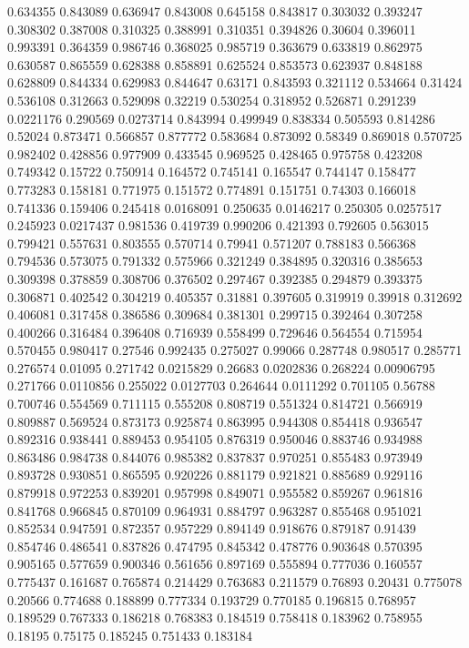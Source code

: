0.634355 0.843089
0.636947 0.843008
0.645158 0.843817
0.303032 0.393247
0.308302 0.387008
0.310325 0.388991
0.310351 0.394826
0.30604 0.396011
0.993391 0.364359
0.986746 0.368025
0.985719 0.363679
0.633819 0.862975
0.630587 0.865559
0.628388 0.858891
0.625524 0.853573
0.623937 0.848188
0.628809 0.844334
0.629983 0.844647
0.63171 0.843593
0.321112 0.534664
0.31424 0.536108
0.312663 0.529098
0.32219 0.530254
0.318952 0.526871
0.291239 0.0221176
0.290569 0.0273714
0.843994 0.499949
0.838334 0.505593
0.814286 0.52024
0.873471 0.566857
0.877772 0.583684
0.873092 0.58349
0.869018 0.570725
0.982402 0.428856
0.977909 0.433545
0.969525 0.428465
0.975758 0.423208
0.749342 0.15722
0.750914 0.164572
0.745141 0.165547
0.744147 0.158477
0.773283 0.158181
0.771975 0.151572
0.774891 0.151751
0.74303 0.166018
0.741336 0.159406
0.245418 0.0168091
0.250635 0.0146217
0.250305 0.0257517
0.245923 0.0217437
0.981536 0.419739
0.990206 0.421393
0.792605 0.563015
0.799421 0.557631
0.803555 0.570714
0.79941 0.571207
0.788183 0.566368
0.794536 0.573075
0.791332 0.575966
0.321249 0.384895
0.320316 0.385653
0.309398 0.378859
0.308706 0.376502
0.297467 0.392385
0.294879 0.393375
0.306871 0.402542
0.304219 0.405357
0.31881 0.397605
0.319919 0.39918
0.312692 0.406081
0.317458 0.386586
0.309684 0.381301
0.299715 0.392464
0.307258 0.400266
0.316484 0.396408
0.716939 0.558499
0.729646 0.564554
0.715954 0.570455
0.980417 0.27546
0.992435 0.275027
0.99066 0.287748
0.980517 0.285771
0.276574 0.01095
0.271742 0.0215829
0.26683 0.0202836
0.268224 0.00906795
0.271766 0.0110856
0.255022 0.0127703
0.264644 0.0111292
0.701105 0.56788
0.700746 0.554569
0.711115 0.555208
0.808719 0.551324
0.814721 0.566919
0.809887 0.569524
0.873173 0.925874
0.863995 0.944308
0.854418 0.936547
0.892316 0.938441
0.889453 0.954105
0.876319 0.950046
0.883746 0.934988
0.863486 0.984738
0.844076 0.985382
0.837837 0.970251
0.855483 0.973949
0.893728 0.930851
0.865595 0.920226
0.881179 0.921821
0.885689 0.929116
0.879918 0.972253
0.839201 0.957998
0.849071 0.955582
0.859267 0.961816
0.841768 0.966845
0.870109 0.964931
0.884797 0.963287
0.855468 0.951021
0.852534 0.947591
0.872357 0.957229
0.894149 0.918676
0.879187 0.91439
0.854746 0.486541
0.837826 0.474795
0.845342 0.478776
0.903648 0.570395
0.905165 0.577659
0.900346 0.561656
0.897169 0.555894
0.777036 0.160557
0.775437 0.161687
0.765874 0.214429
0.763683 0.211579
0.76893 0.20431
0.775078 0.20566
0.774688 0.188899
0.777334 0.193729
0.770185 0.196815
0.768957 0.189529
0.767333 0.186218
0.768383 0.184519
0.758418 0.183962
0.758955 0.18195
0.75175 0.185245
0.751433 0.183184
